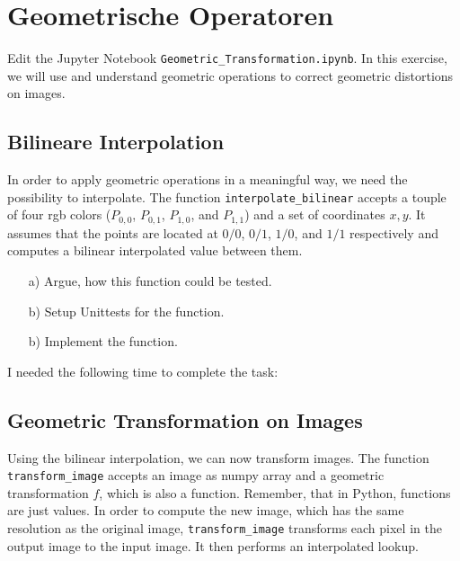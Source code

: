 \def\firstname{firstname}
\def\lastname{lastname}
\def\aufgabenblatt{3}




\thispagestyle{page1} 

\section{Geometrische Operatoren}

Edit the Jupyter Notebook \texttt{Geometric\_Transformation.ipynb}. In this exercise, we will use and understand geometric operations to correct geometric distortions on images.

\subsection{Bilineare Interpolation}

In order to apply geometric operations in a meaningful way, we need the possibility to interpolate. The function \texttt{interpolate\_bilinear} accepts a touple of four rgb colors
($P_{0,0}$, $P_{0,1}$, $P_{1,0}$, and $P_{1,1}$) and a set of coordinates $x,y$. It assumes that the points are located at $0/0$, $0/1$, $1/0$, and $1/1$ respectively and
computes a bilinear interpolated value between them.

\begin{enumerate}

\item[a)] Argue, how this function could be tested.
\item[b)] Setup Unittests for the function.
\item[b)] Implement the function.

\end{enumerate}

I needed the following time to complete the task:

\subsection{Geometric Transformation on Images}

Using the bilinear interpolation, we can now transform images. The function \texttt{transform\_image} accepts an image as numpy array and a geometric transformation $f$, which is also 
a function. Remember, that in Python, functions are just values. In order to compute the new image, which has the same resolution as the original image, \texttt{transform\_image}
transforms each pixel in the output image to the input image. It then performs an interpolated lookup.

